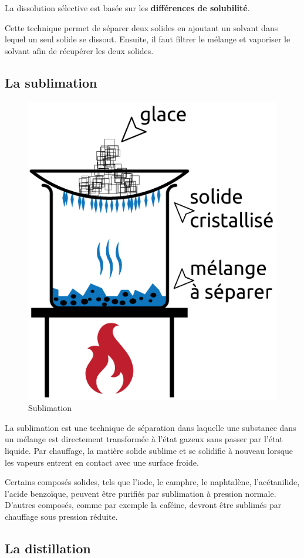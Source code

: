 \documentclass[
  11pt,
  a4paper,
  openany]{book}
\begin{document}

La dissolution sélective est basée sur les \textbf{différences de solubilité}.

Cette technique permet de séparer deux solides en ajoutant un solvant dans lequel un seul solide se dissout. Ensuite, il faut filtrer le mélange et vaporiser le solvant afin de récupérer les deux solides.

\newpage

\subsection{La sublimation}\label{la-sublimation}

\begin{figure}

{\centering \includegraphics[width=0.28\linewidth]{images/sublimation} 

}

\caption{Sublimation}\label{fig:sublimation}
\end{figure}

La sublimation est une technique de séparation dans laquelle une substance dans un mélange est directement transformée à l'état gazeux sans passer par l'état liquide. Par chauffage, la matière solide sublime et se solidifie à nouveau lorsque les vapeurs entrent en contact avec une surface froide.

Certains composés solides, tels que l'iode, le camphre, le naphtalène, l'acétanilide, l'acide benzoïque, peuvent être purifiés par sublimation à pression normale. D'autres composés, comme par exemple la caféine, devront être sublimés par chauffage sous pression réduite.

\subsection{La distillation}\label{la-distillation}
\end{document}
